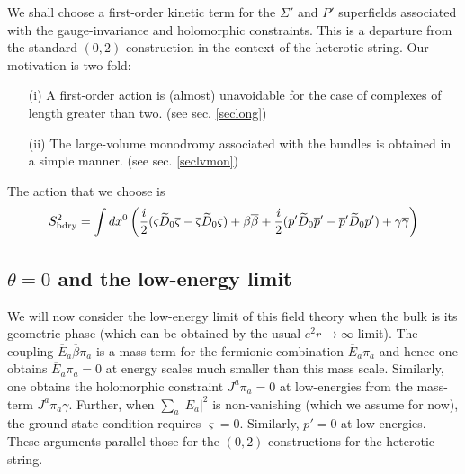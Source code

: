 \documentclass[a4paper,12pt]{article}
\begin{document}
We shall choose a first-order kinetic term for the $\Sigma'$ and $P'$
superfields associated with the gauge-invariance  and holomorphic
constraints. This is a departure from the standard $(0,2)$ construction
in the context of the heterotic string. Our motivation is two-fold: 
\begin{itemize}
\item[(i)] A first-order action is (almost) unavoidable for the case of
complexes of length greater than two. (see sec. \ref{seclong})
\item[(ii)] The large-volume monodromy associated with the bundles is obtained
in a simple manner. (see sec. \ref{seclvmon})
\end{itemize}
The action that we choose is
\begin{equation}
S^2_{\rm bdry} = \int dx^0 \left(
{i\over2} (\varsigma \widetilde{D}_0 \overline{\varsigma} -
\overline{\varsigma} \widetilde{D}_0 \varsigma) + \beta \overline{\beta}
+ {i\over2} (p' \widetilde{D}_0 \overline{p}' -
\overline{p}' \widetilde{D}_0 p') + \gamma \overline{\gamma}
\right)
\end{equation}

\subsection{$\theta=0$ and the low-energy limit}

We will now consider the low-energy limit of this field theory when the
bulk is its geometric phase (which can be obtained by the usual 
$e^2r\rightarrow\infty$ limit). The coupling $\overline{E}_a
\overline{\beta} \pi_a$  is a mass-term for the fermionic combination
$\overline{E}_a \pi_a$ and hence one obtains $\overline{E}_a \pi_a=0$
at energy scales much smaller than this mass scale.
Similarly,  one obtains the holomorphic
constraint $J^a \pi_a=0$  at low-energies from the mass-term
$J^a\pi_a \gamma$. Further, when $\sum_a |E_a|^2$ is non-vanishing
(which we assume for now), the ground state condition requires
$\varsigma=0$. Similarly, $p'=0$ at low energies. These  arguments
parallel those for the $(0,2)$ constructions for the heterotic
string\cite{zerotwo}.
\end{document}
